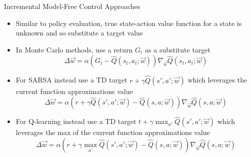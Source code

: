 \begin{frame}[c]{Incremental Model-Free Control Approaches}
	
	\begin{itemize}
		\item Similar to policy evaluation, true state-action value function for a state is unknown and so substitute a target value
		\item In Monte Carlo methods, use a return $G_t$ as a substitute target
		$$\Delta \vec{w} = \alpha(G_t - \hat{Q}(s_t,a_t; \vec{w})) \nabla_{\vec{w}} \hat{Q}(s_t, a_t; \vec{w}) $$
		\item For SARSA instead use a TD target $r+ \gamma \hat{Q}(s', a'; \vec{w})$ which leverages the current function approximations value
		$$\Delta \vec{w} = \alpha (r + \gamma \hat{Q}(s',a';\vec{w}) - \hat{Q}(s,a;\vec{w})) \nabla_{\vec{w}}\hat{Q}(s,a;\vec{w}) $$
		\item For Q-learning instead use a TD target $t + \gamma \max_{a'} \hat{Q}(s',a';\vec{w})$ which leverages the max of the current function approximations value
		$$\Delta \vec{w} = \alpha (r + \gamma \max_{a'} \hat{Q}(s',a';\vec{w}) - \hat{Q}(s,a;\vec{w})) \nabla_{\vec{w}}\hat{Q}(s,a;\vec{w}) $$
	\end{itemize}
	
\end{frame}

